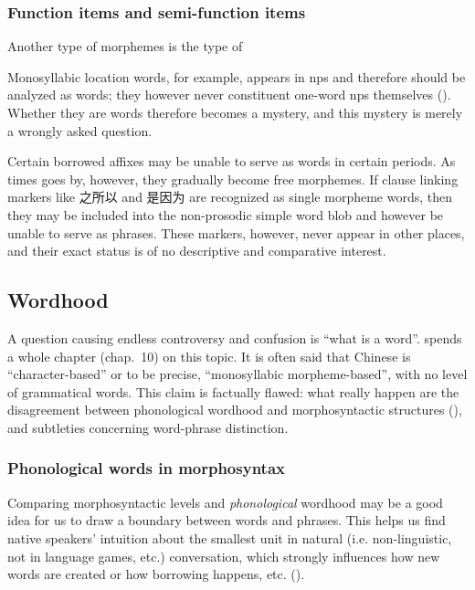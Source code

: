 \documentclass[UTF8, a4paper, oneside, scheme=plain, 12pt]{ctexrep}
\newcommand*{\citechap}[1]{chap.~{#1}}
\begin{document}
\subsubsection{Function items and semi-function items} 

Another type of morphemes is the type of 

Monosyllabic location words, 
for example, appears in \acs{np}s 
and therefore should be analyzed as words;
they however never constituent one-word \acs{np}s themselves
().
Whether they are words therefore becomes a mystery,
and this mystery is merely a wrongly asked question.

Certain borrowed affixes may be unable to serve as words in certain periods.
As times goes by, however, they gradually become free morphemes.
If clause linking markers like 之所以 and 是因为 are recognized as single morpheme words,
then they may be included into the non-prosodic simple word blob 
and however be unable to serve as phrases.
These markers, however, never appear in other places,
and their exact status is of no descriptive and comparative interest.

\subsection{Wordhood}\label{sec:pos.word}

A question causing endless controversy and confusion 
is ``what is a word''. 
\citet{dixon2010basic2} spends a whole chapter (\citechap{10}) on this topic.
It is often said that Chinese is ``character-based''
or to be precise, ``monosyllabic morpheme-based'',
with no level of grammatical words.
This claim is factually flawed:
what really happen are 
the disagreement between phonological wordhood and morphosyntactic structures
(),
and subtleties concerning word-phrase distinction. 

\subsubsection{Phonological words in morphosyntax}\label{sec:pos.word.phonological}

Comparing morphosyntactic levels 
and \emph{phonological} wordhood 
may be a good idea for us to draw a boundary 
between words and phrases.
This helps us find native speakers' intuition 
about the smallest unit in natural (i.e. non-linguistic, not in language games, etc.) conversation,
which strongly influences how new words are created 
or how borrowing happens, etc. ().
\end{document}
